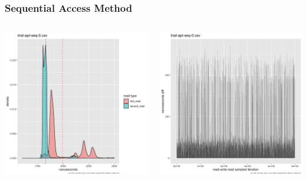 \documentclass{beamer}
\begin{document}
\begin{frame}
 \frametitle{Sequential Access Method}
 \begin{columns}
  \begin{column}{0.5\textwidth}
   \includegraphics[width=\linewidth]{trial-apt-seq-0-histogram.png}

  \end{column}
  \begin{column}{0.5\textwidth}
   \includegraphics[width=\linewidth]{trial-apt-seq-0-barchart.png}

  \end{column}

 \end{columns}

\end{frame}
\end{document}
